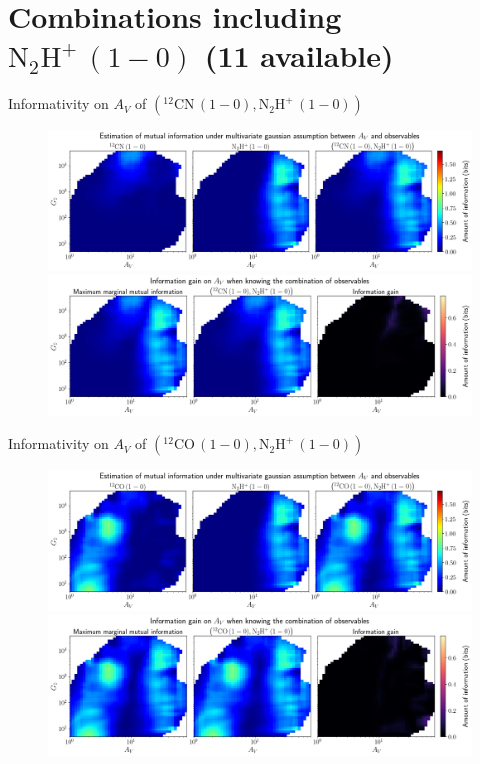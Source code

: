 \documentclass{beamer}
\begin{document}
\section{Combinations including $\mathrm{N_2H^+\,(1-0)}$ (11 available)}

\begin{frame}{Informativity on $A_V$ of $\left(\mathrm{^{12}CN\,(1-0)},\mathrm{N_2H^+\,(1-0)}\right)$}
    \begin{figure}
        \centering
        \includegraphics[width=0.95\linewidth]{../linearinfo/av__12cn10_n2hp10_linearinfo.png}
        \vfill
        \includegraphics[width=0.95\linewidth]{../linearinfo/av__12cn10_n2hp10_linearinfo_gain.png}
    \end{figure}
\end{frame}

\begin{frame}{Informativity on $A_V$ of $\left(\mathrm{^{12}CO\,(1-0)},\mathrm{N_2H^+\,(1-0)}\right)$}
    \begin{figure}
        \centering
        \includegraphics[width=0.95\linewidth]{../linearinfo/av__12co10_n2hp10_linearinfo.png}
        \vfill
        \includegraphics[width=0.95\linewidth]{../linearinfo/av__12co10_n2hp10_linearinfo_gain.png}
    \end{figure}
\end{frame}
\end{document}
